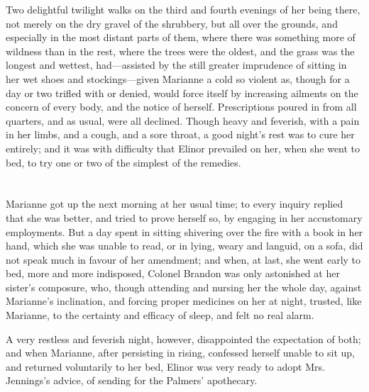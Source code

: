 Two delightful twilight walks on the third and fourth evenings of her being there, not merely on the dry gravel of the shrubbery, but all over the grounds, and especially in the most distant parts of them, where there was something more of wildness than in the rest, where the trees were the oldest, and the grass was the longest and wettest, had---assisted by the still greater imprudence of sitting in her wet shoes and stockings---given Marianne a cold so violent as, though for a day or two trifled with or denied, would force itself by increasing ailments on the concern of every body, and the notice of herself. Prescriptions poured in from all quarters, and as usual, were all declined. Though heavy and feverish, with a pain in her limbs, and a cough, and a sore throat, a good night's rest was to cure her entirely; and it was with difficulty that Elinor prevailed on her, when she went to bed, to try one or two of the simplest of the remedies.

\chapter{} %

Marianne got up the next morning at her usual time; to every inquiry replied that she was better, and tried to prove herself so, by engaging in her accustomary employments. But a day spent in sitting shivering over the fire with a book in her hand, which she was unable to read, or in lying, weary and languid, on a sofa, did not speak much in favour of her amendment; and when, at last, she went early to bed, more and more indisposed, Colonel Brandon was only astonished at her sister's composure, who, though attending and nursing her the whole day, against Marianne's inclination, and forcing proper medicines on her at night, trusted, like Marianne, to the certainty and efficacy of sleep, and felt no real alarm.

A very restless and feverish night, however, disappointed the expectation of both; and when Marianne, after persisting in rising, confessed herself unable to sit up, and returned voluntarily to her bed, Elinor was very ready to adopt Mrs. Jennings's advice, of sending for the Palmers' apothecary.

